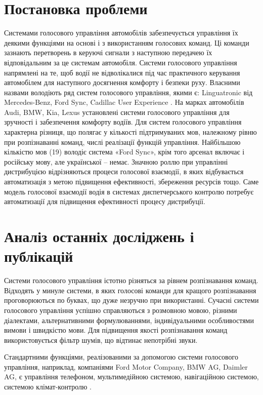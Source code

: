 \section{Постановка проблеми}
 
Системами голосового управління автомобілів забезпечується управління їх деякими функціями на основі і з використанням голосових команд. Ці команди зазнають перетворень в керуючі сигнали з наступною передачею їх відповідальним за це системам автомобіля. Системи голосового управління напрямлені на те, щоб водії не відволікалися під час практичного керування автомобілем для наступного досягнення комфорту і безпеки руху. Власними назвами володіють ряд систем голосового управління, якими є: Linguatronic від Mercedes-Benz, Ford Sync, Cadillac User Experience \cite{art1,Kravchenko_2009,Heisterkamp_2001,Jonsson_2009}. На марках автомобілів Audi, BMW, Kia, Lexus установлені системи голосового управління для зручності і забезпечення комфорту водіїв. Для систем голосового управління характерна різниця, що полягає у кількості підтримуваних мов, належному рівню при розпізнаванні команд, числі реалізації функцій управління. Найбільшою кількістю мов (19) володіє система «Ford Sync», крім того арсенал включає і російську мову, але української – немає. Значною роллю при управлінні дистрибуцією відрізняються процеси голосової взаємодії, в яких відбувається автоматизація з метою підвищення ефективності, збереження ресурсів тощо. Саме модель голосової взаємодії водія в системах диспетчерського контролю потребує автоматизації для підвищення ефективності процесу дистрибуції.

\section{Аналіз останніх досліджень і публікацій}

Системи голосового управління істотно різняться за рівнем розпізнавання команд. Відходять у минуле системи, в яких голосові команди для кращого розпізнавання проговорюються по буквах, що дуже незручно при використанні. Сучасні системи голосового управління успішно справляються з розмовною мовою, різними діалектами, альтернативними формулюваннями, індивідуальними особливостями вимови і швидкістю мови. Для підвищення якості розпізнавання команд використовується фільтр шумів, що відтинає непотрібні звуки.

Стандартними функціями, реалізованими за допомогою системи голосового управління, наприклад, компаніями Ford Motor Company, BMW AG, Daimler AG, є управління телефоном, мультимедійною системою, навігаційною системою, системою клімат-контролю \cite{Kravchenko_2009,Heisterkamp_2001,Jonsson_2009}.

